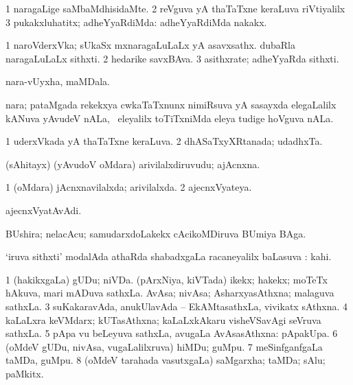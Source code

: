 \bentry
{}
\gl{\kirxvi}
\bmng
\bnum
\num{1} naragaLige saMbaMdhisidaMte. 
\num{2} reVguva yA thaTaTxne keraLuva riVtiyalilx 
\num{3} pukakxluhatitx; adheYyaRdiMda:  adheYyaRdiMda nakakx. 
\enum
\emng
\eentry

\bentry
{}
\gl{\nA}
\bmng
\bnum
\num{1} naroVderxVka; sUkaSx mxnaragaLuLaLx yA asavxsathx. dubaRla naragaLuLaLx sithxti. 
\num{2} hedarike savxBAva. 
\num{3} asithxrate; adheYyaRda sithxti. 
\enum
\emng
\eentry

\bentry
{}
\gl{\nA}
\bmng
nara-vUyxha, maMDala. 
\emng
\eentry

\bentry
{}
\gl{\nA}
\bmng
nara; pataMgada rekekxya cwkaTaTxnunx nimiRsuva yA sasayxda elegaLalilx kANuva yAvudeV nALa, \kanmu\ eleyalilx toTiTxniMda eleya tudige hoVguva nALa. 
\emng
\eentry


\bentry
{}
\gl{\gu}
\bmng
\bnum
\num{1} uderxVkada yA thaTaTxne keraLuva. 
\num{2} dhASaTxyXRtanada; udadhxTa. 
\enum
\emng
\eentry

\bentry
{}
\gl{\nA}
\bmng
(sAhitayx) (yAvudoV oMdara) arivilalxdiruvudu; ajAcnxna. 
\emng
\eentry

\bentry
{}
\gl{\gu}
\bmng
\bnum
\num{1} (oMdara) jAcnxnavilalxda; arivilalxda. 
\num{2} ajecnxVyateya. 
\enum
\emng
\eentry

\bentry
{}
\gl{\nA}
\bmng
ajecnxVyatAvAdi. 
\emng
\eentry

\bentry
{}
\gl{\nA}
\bmng
BUshira; nelacAcu; samudarxdoLakekx cAcikoMDiruva BUmiya BAga. 
\emng
\eentry

\bentry
{}
\gl{\uparx}
\bmng
`iruva sithxti' modalAda athaRda shabadxgaLa racaneyalilx baLasuva \uparx:  kahi. 
\emng
\eentry

\bentry
{}
\gl{\nA}
\bmng
\bnum
\num{1} (hakikxgaLa) gUDu; niVDa. 
 (pArxNiya, kiVTada) 
\banum
{} ikekx; hakekx; moTeTx hAkuva, mari mADuva sathxLa. 
 AvAsa; nivAsa; AsharxyasAthxna; malaguva sathxLa. 
\eanum
\numie
\num{3} suKakaravAda, anukUlavAda -- EkAMtasathxLa, vivikatx sAthxna. 
\num{4} kaLaLxra keVMdarx; kUTasAthxna; kaLaLxkAkaru visheVSavAgi seVruva sathxLa. 
\num{5} pApa \mo vu beLeyuva sathxLa, avugaLa AvAsasAthxna:  pApakUpa. 
\num{6} (oMdeV gUDu, nivAsa, \mo vugaLalilxruva) hiMDu; guMpu. 
\num{7} meSinfganfgaLa taMDa, guMpu. 
\num{8} (oMdeV tarahada vasutxgaLa) saMgarxha; taMDa; sAlu; paMkitx. 
\enum
\emng

